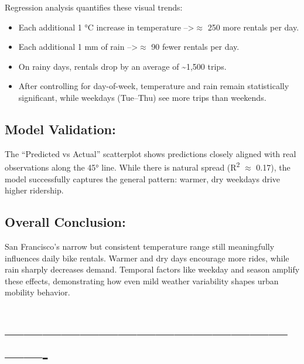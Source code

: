 \documentclass{article}
\begin{document}
Regression analysis quantifies these visual trends:

\begin{itemize}
\item Each additional 1 °C increase in temperature --\textgreater  $\approx$ 250 more rentals per day.
\item Each additional 1 mm of rain --\textgreater  $\approx$ 90 fewer rentals per day.
\item On rainy days, rentals drop by an average of {\textasciitilde}1,500 trips.
\item After controlling for day-of-week, temperature and rain remain statistically significant, while weekdays (Tue--Thu) see more trips than weekends.
\end{itemize}

\subsection{\textbf{Model Validation:}}

The ``Predicted vs Actual'' scatterplot shows predictions closely aligned with real observations along the 45° line.
While there is natural spread (R\textsuperscript{2} $\approx$ 0.17), the model successfully captures the general pattern: warmer, dry weekdays drive higher ridership.

\subsection{\textbf{Overall Conclusion:}}

San Francisco's narrow but consistent temperature range still meaningfully influences daily bike rentals. Warmer and dry days encourage more rides, while rain sharply decreases demand. Temporal factors like weekday and season amplify these effects, demonstrating how even mild weather variability shapes urban mobility behavior.

\section{----------------------------------------------------}
\end{document}
